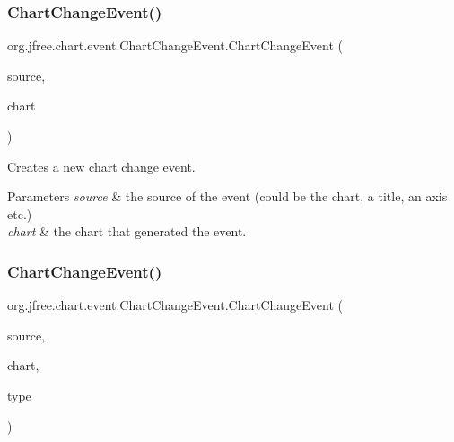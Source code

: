 \subsubsection{\texorpdfstring{Chart\+Change\+Event()}{ChartChangeEvent()}\hspace{0.1cm}{\footnotesize\ttfamily [2/3]}}
{\footnotesize\ttfamily org.\+jfree.\+chart.\+event.\+Chart\+Change\+Event.\+Chart\+Change\+Event (\begin{DoxyParamCaption}\item[{Object}]{source,  }\item[{\mbox{\hyperlink{classorg_1_1jfree_1_1chart_1_1_j_free_chart}{J\+Free\+Chart}}}]{chart }\end{DoxyParamCaption})}

Creates a new chart change event.


\begin{DoxyParams}{Parameters}
{\em source} & the source of the event (could be the chart, a title, an axis etc.) \\
\hline
{\em chart} & the chart that generated the event. \\
\hline
\end{DoxyParams}
\mbox{\label{classorg_1_1jfree_1_1chart_1_1event_1_1_chart_change_event_aa4cd0f01b03b0fe72d20c5fed21ed8ab}} 
\subsubsection{\texorpdfstring{Chart\+Change\+Event()}{ChartChangeEvent()}\hspace{0.1cm}{\footnotesize\ttfamily [3/3]}}
{\footnotesize\ttfamily org.\+jfree.\+chart.\+event.\+Chart\+Change\+Event.\+Chart\+Change\+Event (\begin{DoxyParamCaption}\item[{Object}]{source,  }\item[{\mbox{\hyperlink{classorg_1_1jfree_1_1chart_1_1_j_free_chart}{J\+Free\+Chart}}}]{chart,  }\item[{\mbox{\hyperlink{classorg_1_1jfree_1_1chart_1_1event_1_1_chart_change_event_type}{Chart\+Change\+Event\+Type}}}]{type }\end{DoxyParamCaption})}

